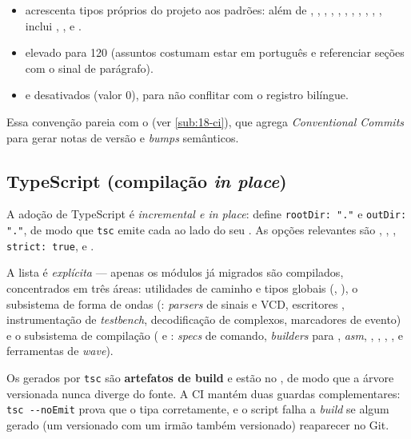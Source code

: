 \begin{itemize}[nosep]
  \item {} acrescenta tipos próprios do projeto aos padrões:
        além de , , , ,
        , , , , ,
        , , inclui , ,
         e .
  \item {} elevado para 120 (assuntos costumam estar em
        português e referenciar seções com o sinal de parágrafo).
  \item {} e  desativados
        (valor 0), para não conflitar com o registro bilíngue.
\end{itemize}

Essa convenção pareia com o  (ver
\autoref{sub:18-ci}), que agrega \emph{Conventional Commits} para gerar
notas de versão e \emph{bumps} semânticos.

\subsection{TypeScript (compilação \emph{in place})}
\label{sub:18-typescript}

A adoção de TypeScript é \emph{incremental e in place}: 
define \lstinline|rootDir: "."| e \lstinline|outDir: "."|, de modo que
\lstinline|tsc| emite cada  ao lado do seu . As opções
relevantes são , ,
, \lstinline|strict: true|,
 e .

A lista  é \emph{explícita} --- apenas os módulos já migrados são
compilados, concentrados em três áreas: utilidades de caminho e tipos globais
(, ), o
subsistema de forma de ondas (: \emph{parsers} de sinais e
VCD, escritores , instrumentação de \emph{testbench}, decodificação
de complexos, marcadores de evento) e o subsistema de compilação
( e : \emph{specs}
de comando, \emph{builders} para \cmm, \emph{asm}, ,
, , ,  e ferramentas de
\emph{wave}).

\begin{nota}
Os  gerados por \lstinline|tsc| são \textbf{artefatos de build} e estão
no , de modo que a árvore versionada nunca diverge do fonte.
A CI mantém duas guardas complementares: \lstinline|tsc --noEmit| prova que o
 tipa corretamente, e o script 
falha a \emph{build} se algum  gerado (um  versionado com um
 irmão também versionado) reaparecer no Git.
\end{nota}

